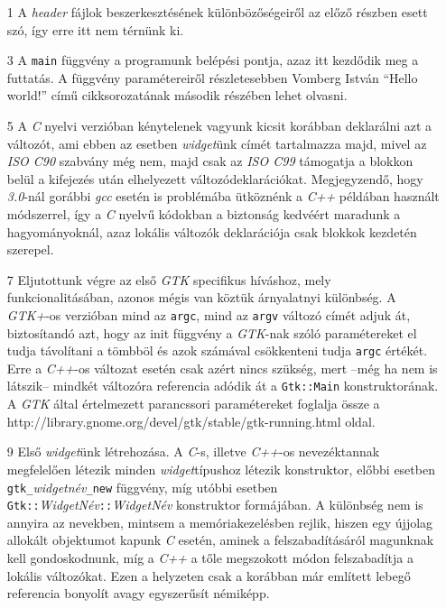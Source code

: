\documentclass[a4paper,10pt]{article}
\begin{document}
\begin{enumerate}
 \item[1] A \textit{header} fájlok beszerkesztésének különbözőségeiről az előző részben esett szó, így erre itt nem térnünk ki.

 \item[3] A \texttt{main} függvény a programunk belépési pontja, azaz itt kezdődik meg a futtatás. A függvény paramétereiről részletesebben Vomberg István ``Hello world!'' című cikksorozatának második részében lehet olvasni.

 \item[5] A \textit{C} nyelvi verzióban kénytelenek vagyunk kicsit korábban deklarálni azt a változót, ami ebben az esetben \textit{widget}ünk címét tartalmazza majd, mivel az \textit{ISO C90} szabvány még nem, majd csak az \textit{ISO C99} támogatja a blokkon belül a kifejezés után elhelyezett változódeklarációkat. Megjegyzendő, hogy \textit{3.0}-nál gorábbi \textit{gcc} esetén is problémába ütköznénk a \textit{C++} példában használt módszerrel, így a \textit{C} nyelvű kódokban a biztonság kedvéért maradunk a hagyományoknál, azaz lokális változók deklarációja csak blokkok kezdetén szerepel.

 \item[7] Eljutottunk végre az első \textit{GTK} specifikus híváshoz, mely funkcionalitásában, azonos mégis van köztük árnyalatnyi különbség. A \textit{GTK+}-os verzióban mind az \texttt{argc}, mind az \texttt{argv} változó címét adjuk át, biztosítandó azt, hogy az init függvény a \textit{GTK}-nak szóló paramétereket el tudja távolítani a tömbböl és azok számával csökkenteni tudja \texttt{argc} értékét. Erre a \textit{C++}-os változat esetén csak azért nincs szükség, mert --még ha nem is látszik-- mindkét változóra referencia adódik át a \texttt{Gtk::Main} konstruktorának. A \textit{GTK} által értelmezett parancssori paramétereket foglalja össze a http://library.gnome.org/devel/gtk/stable/gtk-running.html oldal.

 \item[9] Első \textit{widget}ünk létrehozása. A \textit{C}-s, illetve \textit{C++}-os nevezéktannak megfelelően létezik minden \textit{widget}típushoz létezik konstruktor, előbbi esetben \texttt{gtk\_}\textit{widgetnév}\texttt{\_new} függvény, míg utóbbi esetben \texttt{Gtk::}\textit{WidgetNév}\texttt{::}\textit{WidgetNév} konstruktor formájában. A különbség nem is annyira az nevekben, mintsem a memóriakezelésben rejlik, hiszen egy újjolag allokált objektumot kapunk \textit{C} esetén, aminek a felszabadításáról magunknak kell gondoskodnunk, míg a \textit{C++} a tőle megszokott módon felszabadítja a lokális változókat. Ezen a helyzeten csak a korábban már említett lebegő referencia bonyolít avagy egyszerűsít némiképp.


\end{enumerate}
\end{document}
